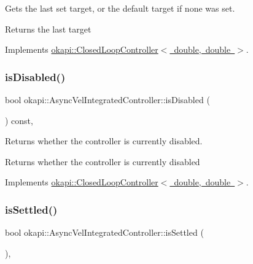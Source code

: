 Gets the last set target, or the default target if none was set.

\begin{DoxyReturn}{Returns}
the last target 
\end{DoxyReturn}


Implements \mbox{\hyperlink{classokapi_1_1ClosedLoopController_a22012bedbfaff6e5a3a508f274ec2497}{okapi\+::\+Closed\+Loop\+Controller$<$ double, double $>$}}.

\mbox{\label{classokapi_1_1AsyncVelIntegratedController_ad4c6394b3512ae44ffa36c9e01f6321b}} 
\subsubsection{\texorpdfstring{isDisabled()}{isDisabled()}}
{\footnotesize\ttfamily bool okapi\+::\+Async\+Vel\+Integrated\+Controller\+::is\+Disabled (\begin{DoxyParamCaption}{ }\end{DoxyParamCaption}) const\hspace{0.3cm}{\ttfamily [override]}, {\ttfamily [virtual]}}

Returns whether the controller is currently disabled.

\begin{DoxyReturn}{Returns}
whether the controller is currently disabled 
\end{DoxyReturn}


Implements \mbox{\hyperlink{classokapi_1_1ClosedLoopController_a40bd4ec2b8c75503fbf6f494fd7cbe69}{okapi\+::\+Closed\+Loop\+Controller$<$ double, double $>$}}.

\mbox{\label{classokapi_1_1AsyncVelIntegratedController_a8518d706827ccc8d42d0a401566d58f7}} 
\subsubsection{\texorpdfstring{isSettled()}{isSettled()}}
{\footnotesize\ttfamily bool okapi\+::\+Async\+Vel\+Integrated\+Controller\+::is\+Settled (\begin{DoxyParamCaption}{ }\end{DoxyParamCaption})\hspace{0.3cm}{\ttfamily [override]}, {\ttfamily [virtual]}}

